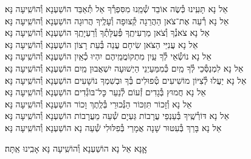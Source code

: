 \documentclass[twoside, openany, parskip=half, 11pt]{book}
\begin{document}
\begin{small}
אֵל נָא תָּעִֽינוּ כְּ֯שֶׂה אוֹבֵד שְׁ֯מֵֽנוּ מִסִּפְרְ֯ךָ אַל תְּ֯אַבֵּד \hfill הוֹשַׁעְנָא וְ֯הוֹשִֽׁיעָה נָּא׃ \\
אֵל נָא רְ֯עֵה אֶת־צֹאן הַהֲרֵגָה קְ֯צוּפָה וְ֯עָלֶֽיךָ הֲרוּגָה \hfill הוֹשַׁעְנָא וְ֯הוֹשִֽׁיעָה נָּא׃\\
אֵל נָא צֹאנְ֯ךָ וְ֯צֹאן מַרְעִיתֶֽךָ פְּ֯עֻלָּתְ֯ךָ וְ֯רַעְיָתֶֽךָ \hfill הוֹשַׁעְנָא וְ֯הוֹשִֽׁיעָה נָּא׃\\
אֵל נָא עֲנִיֵּי הַצֹּאן שִׂיחָם עֲנֵה בְּ֯עֵת רָצוֹן \hfill הוֹשַׁעְנָא וְ֯הוֹשִֽׁיעָה נָּא׃\\
אֵל נָא נוֹשְׂ֯אֵי לְ֯ךָ עַֽיִן מִתְקוֹמֲמֵֽיהֶם יִהְיוּ כְ֯אַֽיִן \hfill הוֹשַׁעְנָא וְ֯הוֹשִֽׁיעָה נָּא׃\\
אֵל נָא לִמְנַסְּ֯כֵי לְ֯ךָ מַֽיִם כְּ֯מִמַּעַיְנֵי הַיְשׁוּעָה יִשְׁאֲבוּן מַֽיִם \hfill הוֹשַׁעְנָא וְ֯הוֹשִֽׁיעָה נָּא׃\\
אֵל נָא יַעֲלוּ לְ֯צִיּוֹן מוֹשִׁיעִים טְ֯פוּלִים בְּ֯ךָ וּבְשִׁמְךָ נוֹשָׁעִים \hfill הוֹשַׁעְנָא וְ֯הוֹשִֽׁיעָה נָּא׃\\
אֵל נָא חֲמוּץ בְּ֯גָדִים זְ֯עוֹם לְ֯נַעֵר כׇּל־בּוֹגְ֯דִים \hfill הוֹשַׁעְנָא וְ֯הוֹשִֽׁיעָה נָּא׃\\
אֵל נָא וְ֯זָכוֹר תִּזְכּוֹר הַנְּ֯כוּרֵי בְּ֯לֶֽתֶךְ וָכוֹר \hfill הוֹשַׁעְנָא וְ֯הוֹשִֽׁיעָה נָּא׃\\
אֵל נָא דּוֹרְ֯שֶֽׁיךָ בְּ֯עַנְפֵי עֲרָבוֹת גַּעְיָם שְׁ֯עֵה מֵעֲרָבוֹת \hfill הוֹשַׁעְנָא וְ֯הוֹשִֽׁיעָה נָּא׃\\
אֵל נָא בָּרֵךְ בְּ֯עִטּוּר שָׁנָה אֲמָרַי בְּ֯פִלּוּלִי שְׁ֯עֵה נָא \hfill הוֹשַׁעְנָא וְ֯הוֹשִֽׁיעָה נָּא׃

\end{small}

\begin{large}
\shatzvkahal
אׇׇנָּא אֵל נָא הוֹשַׁעְנָא וְ֯הוֹשִֽׁיעָה נָּא אָבִֽינוּ אַֽתָּה׃

\end{large}
\end{document}
